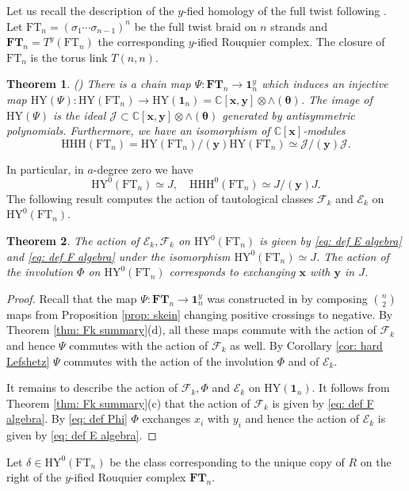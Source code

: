 \documentclass{amsart}
\newcommand{\C}{\mathbb{C}}
\newcommand{\xx}{\mathbf{x}}
\newcommand{\yy}{\mathbf{y}}
\newcommand{\ttheta}{\boldsymbol{\theta}}
\newcommand{\FT}{\mathrm{FT}}
\newcommand{\HY}{\mathrm{HY}}
\newcommand{\one}{\mathbf{1}}
\newcommand{\CE}{\mathcal{E}}
\newcommand{\CF}{\mathcal{F}}
\newcommand{\HHH}{\mathrm{HHH}}
\newcommand{\bFT}{\mathbf{FT}}
\newcommand{\cJ}{\mathcal{J}}
\numberwithin{equation}{section}
\newtheorem{theorem}{Theorem}[section]
\theoremstyle{definition}
\begin{document}
Let us recall the description of the $y$-fied homology of the full twist following \cite{GH}. Let $\FT_n=(\sigma_1\cdots\sigma_{n-1})^{n}$ be the full twist braid on $n$ strands and $\bFT_n=T^y(\FT_n)$ the corresponding $y$-ified Rouquier complex. The closure of $\FT_n$ is the torus link $T(n,n)$.

\begin{theorem}(\cite{GH})
\label{thm: GH}
There is a chain map $\Psi:\bFT_n\to \one_n^y$ which induces an injective map $\HY(\Psi):\HY(\FT_n)\to \HY(\one_n)=\C[\xx,\yy]\otimes \wedge(\ttheta)$. The image of $\HY(\Psi)$ is the ideal $\cJ\subset \C[\xx,\yy]\otimes \wedge(\ttheta)$ generated by antisymmetric polynomials.
Furthermore, we have an isomorphism of $\C[\xx]$-modules
$$
\HHH(\FT_n)=\HY(\FT_n)/(\yy)\HY(\FT_n)\simeq \cJ/(\yy)\cJ.
$$
\end{theorem}

In particular, in $a$-degree zero we have $$
\HY^0(\FT_n)\simeq J,\quad \HHH^0(\FT_n)\simeq J/(\yy)J.
$$
The following result computes the action of tautological classes $\CF_k$ and $\CE_k$ on $\HY^0(\FT_n)$.

\begin{theorem}
\label{thm: tautol FT}
The action of $\CE_k,\CF_k$ on $\HY^0(\FT_n)$ is given by \eqref{eq: def E algebra} and \eqref{eq: def F algebra} under the isomorphism $\HY^0(\FT_n)\simeq J$. The action of the involution $\Phi$ on $\HY^0(\FT_n)$ corresponds to exchanging $\xx$ with $\yy$ in $J$.
\end{theorem}

\begin{proof}
Recall that the map $\Psi:\bFT_n\to \one_n^y$ was constructed in \cite{GH} by composing $\binom{n}{2}$ maps  from Proposition \ref{prop: skein} changing positive crossings to negative. By Theorem \ref{thm: Fk summary}(d), all these maps commute with the action of $\CF_k$ and hence $\Psi$ commutes with the action of $\CF_k$ as well.  By Corollary \ref{cor: hard Lefshetz} $\Psi$ commutes with the action of the involution $\Phi$ and of $\CE_k$.

It remains to describe the action of $\CF_k,\Phi$ and $\CE_k$ on $\HY(\one_n)$. It follows from Theorem \ref{thm: Fk summary}(c) that the action of $\CF_k$ is given by \eqref{eq: def F algebra}. By \eqref{eq: def Phi} $\Phi$ exchanges $x_i$ with $y_i$ and hence the action of $\CE_k$ is given by \eqref{eq: def E algebra}.
\end{proof}

Let $\delta\in \HY^0(\FT_n)$ be the  class corresponding to the unique copy of $R$ on the right of the $y$-ified Rouquier complex $\bFT_n$. 
\end{document}
